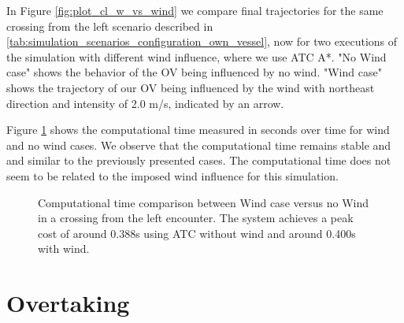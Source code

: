         In Figure \ref{fig:plot_cl_w_vs_wind} we compare final trajectories for the same crossing from the left scenario described in \ref{tab:simulation_scenarios_configuration_own_vessel}, now for two executions of the simulation with different wind influence, where we use \ac{ATC} A*. "No Wind case" shows the behavior of the \ac{OV} being influenced by no wind. "Wind case" shows the trajectory of our \ac{OV} being influenced by the wind with northeast direction and intensity of 2.0 m/s, indicated by an arrow.
        
        
        Figure \ref{fig:plot_cl_w_vs_wind_CT} shows the computational time measured in seconds over time for wind and no wind cases. We observe that the computational time remains stable and and similar to the previously presented cases. The computational time does not seem to be related to the imposed wind influence for this simulation. 
        \begin{figure}[H]
            \centering
            
            \caption{Computational time comparison between Wind case versus no Wind in a crossing from the left encounter. The system achieves a peak cost of around 0.388s using \ac{ATC} without wind and around 0.400s with wind.}
            \label{fig:plot_cl_w_vs_wind_CT}
        \end{figure}
        
        \section{Overtaking}
        
